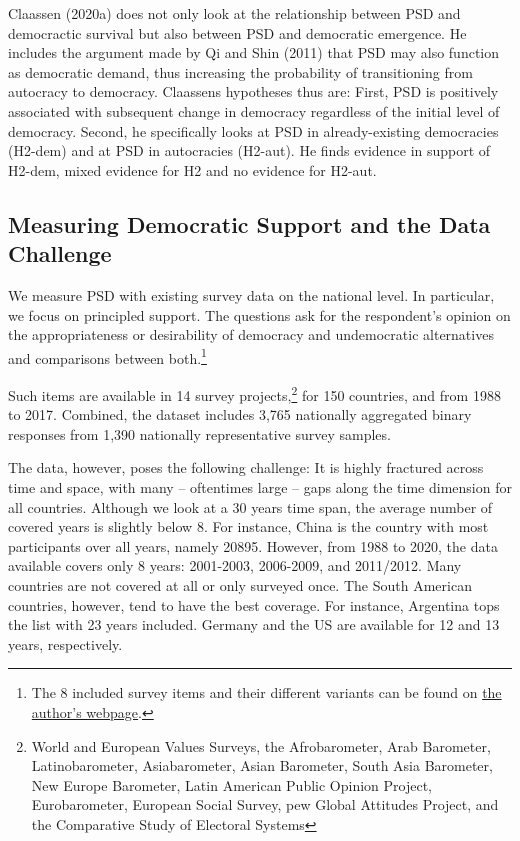 \documentclass[12pt,english,a4paper,oneside]{article}
\theoremstyle{definition}
\theoremstyle{definition}
\theoremstyle{definition}
\theoremstyle{definition}
\theoremstyle{remark}
\begin{document}
Claassen (2020a) does not only look at the relationship between PSD and democractic survival but also between PSD and democratic emergence. He includes the argument made by Qi and Shin (2011) that PSD may also function as democratic demand, thus increasing the probability of transitioning from autocracy to democracy. Claassens hypotheses thus are: First, PSD is positively associated with subsequent change in democracy regardless of the initial level of democracy. Second, he specifically looks at PSD in already-existing democracies (H2-dem) and at PSD in autocracies (H2-aut). He finds evidence in support of H2-dem, mixed evidence for H2 and no evidence for H2-aut.

\hypertarget{measuring-democratic-support-and-the-data-challenge}{%
\subsection{Measuring Democratic Support and the Data Challenge}\label{measuring-democratic-support-and-the-data-challenge}}

We measure PSD with existing survey data on the national level. In particular, we focus on principled support. The questions ask for the respondent's opinion on the appropriateness or desirability of democracy and undemocratic alternatives and comparisons between both.\footnote{The 8 included survey items and their different variants can be found on \href{http://chrisclaassen.com/docs/Democratic_mood_supp_materials.pdf}{the author's webpage}.}

Such items are available in 14 survey projects,\footnote{World and European Values Surveys, the Afrobarometer, Arab Barometer, Latinobarometer, Asiabarometer, Asian Barometer, South Asia Barometer, New Europe Barometer, Latin American Public Opinion Project, Eurobarometer, European Social Survey, pew Global Attitudes Project, and the Comparative Study of Electoral Systems} for 150 countries, and from 1988 to 2017. Combined, the dataset includes 3,765 nationally aggregated binary responses from 1,390 nationally representative survey samples.

The data, however, poses the following challenge: It is highly fractured across time and space, with many -- oftentimes large -- gaps along the time dimension for all countries. Although we look at a 30 years time span, the average number of covered years is slightly below 8. For instance, China is the country with most participants over all years, namely 20895. However, from 1988 to 2020, the data available covers only 8 years: 2001-2003, 2006-2009, and 2011/2012. Many countries are not covered at all or only surveyed once. The South American countries, however, tend to have the best coverage. For instance, Argentina tops the list with 23 years included. Germany and the US are available for 12 and 13 years, respectively.
\end{document}
